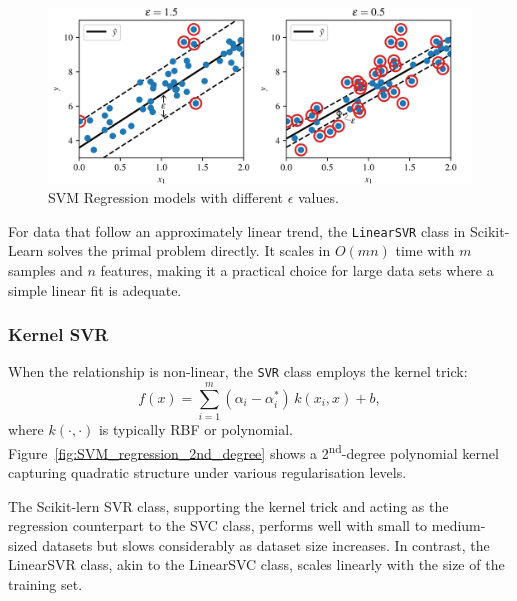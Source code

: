 \documentclass[12pt,letter]{article}
\begin{document}
\begin{figure}[H]
	\centering
	\vspace{-1ex}
	\includegraphics[width=6.5in]{../figures/SVM_Regression.png}
\vspace{-2ex}
	\caption{SVM Regression models with different $\epsilon$ values.}
	\label{fig:SVM_Regression}
\end{figure}

For data that follow an approximately linear trend, the \texttt{LinearSVR} class in Scikit-Learn solves the primal problem directly. It scales in $O(mn)$ time with $m$ samples and $n$ features, making it a practical choice for large data sets where a simple linear fit is adequate.

\subsubsection{Kernel SVR}
\label{sec:svr-kernel}
When the relationship is non-linear, the \texttt{SVR} class employs the kernel trick:
\begin{equation}
f(x)=\sum_{i=1}^{m}(\alpha_i-\alpha_i^{\!*})\,k(x_i,x)+b,
\end{equation}
where $k(\cdot,\cdot)$ is typically RBF or polynomial.  Figure~\ref{fig:SVM_regression_2nd_degree} shows a 2\textsuperscript{nd}-degree polynomial kernel
capturing quadratic structure under various regularisation levels.

The Scikit-lern SVR class, supporting the kernel trick and acting as the regression counterpart to the SVC class, performs well with small to medium-sized datasets but slows considerably as dataset size increases. In contrast, the LinearSVR class, akin to the LinearSVC class, scales linearly with the size of the training set.
\end{document}
